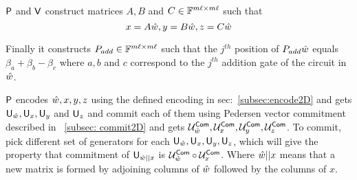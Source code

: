 $\mathsf{P}$ and $\mathsf{V}$ construct matrices $A, B$ and $C \in \mathbb{F}^{m\ell \times m\ell}$ such that 
$$x = A \hat{w}, y= B \hat{w}, z= C \hat{w}$$

Finally it constructs $P_{add} \in \mathbb{F}^{m\ell \times m\ell}$ such that the $j^{th}$ position of $P_{add} \hat{w}$ equals $\beta_a + \beta_b - \beta_c$ where $a, b$ and $c$ correspond to the $j^{th}$ addition gate of the circuit in $\hat{w}$.

$\mathsf{P}$ encodes $\hat{w} , x, y , z$ using the defined encoding in sec:~\ref{subsec:encode2D} and gets $\mathsf{U}_{\hat{w}}, \mathsf{U}_x, \mathsf{U}_y$ and $\mathsf{U}_z$ and commit each of them using Pedersen vector commitment described in ~\ref{subsec: commit2D} and gets $\mathcal{U}^{\mathsf{Com}}_{\hat{w}}, \mathcal{U}^{\mathsf{Com}}_x, \mathcal{U}^{\mathsf{Com}}_y, \mathcal{U}^{\mathsf{Com}}_z$. To commit, pick different set of generators for each $\mathsf{U}_{\hat{w}}, \mathsf{U}_x, \mathsf{U}_y, \mathsf{U}_z$, which will give the property that commitment of $\mathsf{U}_{\hat{w}||x}$ is $\mathcal{U}^{\mathsf{Com}}_{\hat{w}} \circ \mathcal{U}^{\mathsf{Com}}_x$. Where $\hat{w}||x$ means that a new matrix is formed by adjoining columns of $\hat{w}$ followed by the columns of $x$. 

